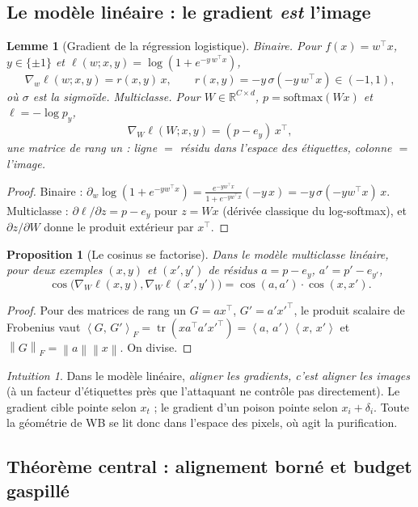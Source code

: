 \documentclass[11pt,a4paper]{article}
\theoremstyle{plain}
\newtheorem{proposition}[theorem]{Proposition}
\newtheorem{lemma}[theorem]{Lemme}
\theoremstyle{definition}
\theoremstyle{remark}
\newtheorem{intuition}[theorem]{Intuition}
\newcommand{\R}{\mathbb{R}}
\newcommand{\norm}[1]{\left\lVert #1 \right\rVert}
\newcommand{\inner}[2]{\left\langle #1,\, #2 \right\rangle}
\newcommand{\xt}{x_t}
\newcommand{\grad}{\nabla}
\DeclareMathOperator{\cosang}{cos}
\begin{document}
\subsection{Le modèle linéaire : le gradient \emph{est} l'image}

\begin{lemma}[Gradient de la régression logistique]\label{lem:loggrad}
\emph{Binaire.} Pour $f(x)=w^\top x$, $y\in\{\pm1\}$ et $\ell(w;x,y)=\log(1+e^{-y\,w^\top x})$,
\[
\grad_w\ell(w;x,y)=r(x,y)\,x,\qquad r(x,y)=-y\,\sigma(-y\,w^\top x)\in(-1,1),
\]
où $\sigma$ est la sigmoïde. \emph{Multiclasse.} Pour $W\in\R^{C\times d}$, $p=\mathrm{softmax}(Wx)$
et $\ell=-\log p_y$,
\[
\grad_W\ell(W;x,y)=(p-e_y)\,x^\top ,
\]
une matrice de rang un : ligne $=$ résidu dans l'espace des étiquettes, colonne $=$ l'image.
\end{lemma}
\begin{proof}
Binaire : $\partial_w\log(1+e^{-yw^\top x})=\frac{e^{-yw^\top x}}{1+e^{-yw^\top x}}(-y\,x)=-y\,\sigma(-yw^\top x)\,x$.
Multiclasse : $\partial\ell/\partial z=p-e_y$ pour $z=Wx$ (dérivée classique du log-softmax), et
$\partial z/\partial W$ donne le produit extérieur par $x^\top$.
\end{proof}

\begin{proposition}[Le cosinus se factorise]\label{prop:factor}
Dans le modèle multiclasse linéaire, pour deux exemples $(x,y)$ et $(x',y')$ de résidus
$a=p-e_y$, $a'=p'-e_{y'}$,
\[
\cosang\big(\grad_W\ell(x,y),\grad_W\ell(x',y')\big)=\cosang(a,a')\cdot\cosang(x,x').
\]
\end{proposition}
\begin{proof}
Pour des matrices de rang un $G=ax^\top$, $G'=a'x'^\top$, le produit scalaire de Frobenius vaut
$\inner{G}{G'}_F=\operatorname{tr}(x a^\top a' x'^\top)=\inner{a}{a'}\inner{x}{x'}$ et
$\norm{G}_F=\norm a\norm x$. On divise.
\end{proof}

\begin{intuition}
Dans le modèle linéaire, \emph{aligner les gradients, c'est aligner les images} (à un facteur
d'étiquettes près que l'attaquant ne contrôle pas directement). Le gradient cible pointe selon
$\xt$ ; le gradient d'un poison pointe selon $x_i+\delta_i$. Toute la géométrie de WB se lit donc
dans l'espace des pixels, où agit la purification.
\end{intuition}

\subsection{Théorème central : alignement borné et budget gaspillé}
\end{document}
